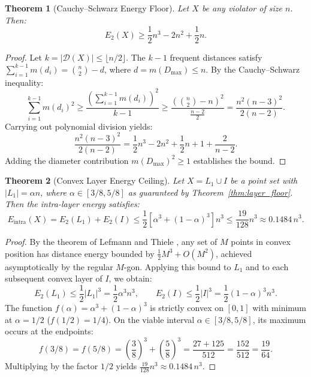 \documentclass[11pt,reqno]{article}
\newtheorem{theorem}{Theorem}
\theoremstyle{definition}
\begin{document}
\begin{theorem}[Cauchy--Schwarz Energy Floor]\label{thm:energy_floor}
Let $X$ be any violator of size $n$. Then:
\[
E_2(X) \ge \frac{1}{2} n^3 - 2n^2 + \frac{1}{2}n.
\]
\end{theorem}
\begin{proof}
Let $k = |\mathcal{D}(X)| \le \lfloor n/2 \rfloor$. The $k - 1$ frequent distances satisfy $\sum_{i=1}^{k-1} m(d_i) = \binom{n}{2} - d$, where $d = m(D_{\max}) \le n$. By the Cauchy--Schwarz inequality:
\[
\sum_{i=1}^{k-1} m(d_i)^2 \ge \frac{\left( \sum_{i=1}^{k-1} m(d_i) \right)^2}{k - 1} \ge \frac{\left( \binom{n}{2} - n \right)^2}{\frac{n-2}{2}} = \frac{n^2(n-3)^2}{2(n-2)}.
\]
Carrying out polynomial division yields:
\[
\frac{n^2(n-3)^2}{2(n-2)} = \frac{1}{2}n^3 - 2n^2 + \frac{1}{2}n + 1 + \frac{2}{n-2}.
\]
Adding the diameter contribution $m(D_{\max})^2 \ge 1$ establishes the bound.
\end{proof}

\begin{theorem}[Convex Layer Energy Ceiling]\label{thm:energy_ceiling}
Let $X = L_1 \cup I$ be a point set with $|L_1| = \alpha n$, where $\alpha \in [3/8, 5/8]$ as guaranteed by Theorem~\ref{thm:layer_floor}. Then the intra-layer energy satisfies:
\[
E_{\text{intra}}(X) = E_2(L_1) + E_2(I) \le \frac{1}{2} \left[ \alpha^3 + (1 - \alpha)^3 \right] n^3 \le \frac{19}{128} n^3 \approx 0.1484\, n^3.
\]
\end{theorem}
\begin{proof}
By the theorem of Lefmann and Thiele \cite{LeTh95}, any set of $M$ points in convex position has distance energy bounded by $\frac{1}{2}M^3 + O(M^2)$, achieved asymptotically by the regular $M$-gon. Applying this bound to $L_1$ and to each subsequent convex layer of $I$, we obtain:
\[
E_2(L_1) \le \frac{1}{2} |L_1|^3 = \frac{1}{2} \alpha^3 n^3, \qquad E_2(I) \le \frac{1}{2} |I|^3 = \frac{1}{2} (1 - \alpha)^3 n^3.
\]
The function $f(\alpha) = \alpha^3 + (1 - \alpha)^3$ is strictly convex on $[0, 1]$ with minimum at $\alpha = 1/2$ ($f(1/2) = 1/4$). On the viable interval $\alpha \in [3/8, 5/8]$, its maximum occurs at the endpoints:
\[
f(3/8) = f(5/8) = \left(\frac{3}{8}\right)^3 + \left(\frac{5}{8}\right)^3 = \frac{27 + 125}{512} = \frac{152}{512} = \frac{19}{64}.
\]
Multiplying by the factor $1/2$ yields $\frac{19}{128} n^3 \approx 0.1484\, n^3$.
\end{proof}
\end{document}
